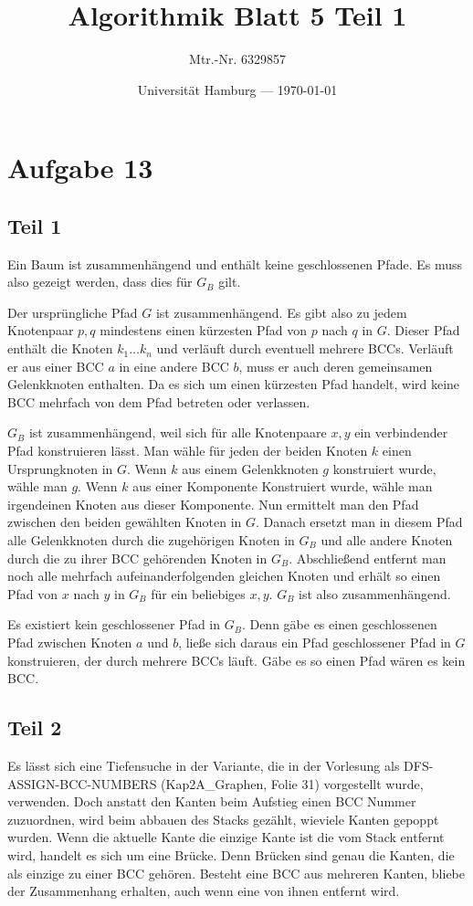 \documentclass[parskip=half,a4paper]{scrartcl}
\title{Algorithmik Blatt 5 Teil 1}
\author{Mtr.-Nr. 6329857}
\date{Universität Hamburg --- \today}
\begin{document}
\maketitle %

\linenumbers

\section*{Aufgabe 13}

\subsection*{Teil 1}

Ein Baum ist zusammenhängend und enthält keine geschlossenen Pfade. Es muss also gezeigt werden, dass dies für $G_B$ gilt.

Der ursprüngliche Pfad $G$ ist zusammenhängend. Es gibt also zu jedem Knotenpaar $p, q$ mindestens einen kürzesten Pfad von $p$ nach $q$ in $G$. Dieser Pfad enthält die Knoten $k_1\dots k_n$ und verläuft durch eventuell mehrere BCCs. Verläuft er aus einer BCC $a$ in eine andere BCC $b$, muss er auch deren gemeinsamen Gelenkknoten enthalten. Da es sich um einen kürzesten Pfad handelt, wird keine BCC mehrfach von dem Pfad betreten oder verlassen.

$G_B$ ist zusammenhängend, weil sich für alle Knotenpaare $x,y$ ein verbindender Pfad konstruieren lässt. Man wähle für jeden der beiden Knoten $k$ einen Ursprungknoten in $G$. Wenn $k$ aus einem Gelenkknoten $g$ konstruiert wurde, wähle man $g$. Wenn $k$ aus einer Komponente Konstruiert wurde, wähle man irgendeinen Knoten aus dieser Komponente. Nun ermittelt man den Pfad zwischen den beiden gewählten Knoten in $G$. Danach ersetzt man in diesem Pfad alle Gelenkknoten durch die zugehörigen Knoten in $G_B$ und alle andere Knoten durch die zu ihrer BCC gehörenden Knoten in $G_B$. Abschließend entfernt man noch alle mehrfach aufeinanderfolgenden gleichen Knoten und erhält so einen Pfad von $x$ nach $y$ in $G_B$ für ein beliebiges $x,y$. $G_B$ ist also zusammenhängend.

Es existiert kein geschlossener Pfad in $G_B$. Denn gäbe es einen geschlossenen Pfad zwischen Knoten $a$ und $b$, ließe sich daraus ein Pfad geschlossener Pfad in $G$ konstruieren, der durch mehrere BCCs läuft. Gäbe es so einen Pfad wären es kein BCC.

\subsection*{Teil 2}

Es lässt sich eine Tiefensuche in der Variante, die in der Vorlesung als DFS-ASSIGN-BCC-NUMBERS (Kap2A\_Graphen, Folie 31) vorgestellt wurde, verwenden. Doch anstatt den Kanten beim Aufstieg einen BCC Nummer zuzuordnen, wird beim abbauen des Stacks gezählt, wieviele Kanten gepoppt wurden. Wenn die aktuelle Kante die einzige Kante ist die vom Stack entfernt wird, handelt es sich um eine Brücke. Denn Brücken sind genau die Kanten, die als einzige zu einer BCC gehören. Besteht eine BCC aus mehreren Kanten, bliebe der Zusammenhang erhalten, auch wenn eine von ihnen entfernt wird.
\end{document}
